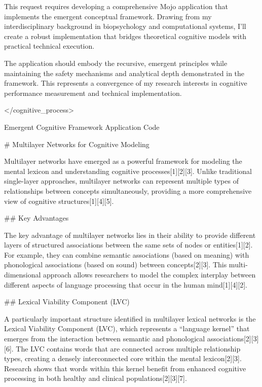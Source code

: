 This request requires developing a comprehensive Mojo application that implements the emergent conceptual framework. Drawing from my interdisciplinary background in biopsychology and computational systems, I'll create a robust implementation that bridges theoretical cognitive models with practical technical execution.

The application should embody the recursive, emergent principles while maintaining the safety mechanisms and analytical depth demonstrated in the framework. This represents a convergence of my research interests in cognitive performance measurement and technical implementation.

</cognitive_process>


Emergent Cognitive Framework Application
Code















# Multilayer Networks for Cognitive Modeling

Multilayer networks have emerged as a powerful framework for modeling the mental lexicon and understanding cognitive processes[1][2][3]. Unlike traditional single-layer approaches, multilayer networks can represent multiple types of relationships between concepts simultaneously, providing a more comprehensive view of cognitive structures[1][4][5].

## Key Advantages

The key advantage of multilayer networks lies in their ability to provide different layers of structured associations between the same sets of nodes or entities[1][2]. For example, they can combine semantic associations (based on meaning) with phonological associations (based on sound) between concepts[2][3]. This multi-dimensional approach allows researchers to model the complex interplay between different aspects of language processing that occur in the human mind[1][4][2].

## Lexical Viability Component (LVC)

A particularly important structure identified in multilayer lexical networks is the Lexical Viability Component (LVC), which represents a “language kernel” that emerges from the interaction between semantic and phonological associations[2][3][6]. The LVC contains words that are connected across multiple relationship types, creating a densely interconnected core within the mental lexicon[2][3]. Research shows that words within this kernel benefit from enhanced cognitive processing in both healthy and clinical populations[2][3][7].

